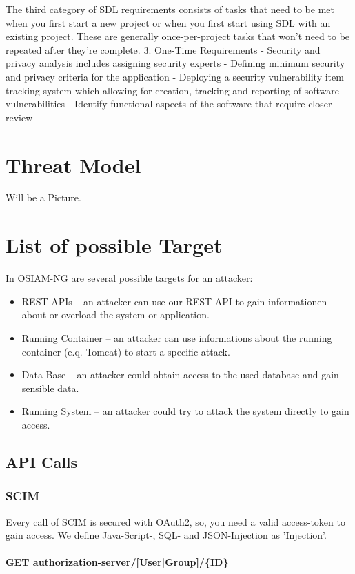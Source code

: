 The third category of SDL requirements consists of tasks that need to be met when you first start a new project or when you first start using SDL with an existing project. These are generally once-per-project tasks that won’t need to be repeated after they’re complete.
3. One-Time Requirements
	- Security and privacy analysis includes assigning security experts
	- Defining minimum security and privacy criteria for the application
	- Deploying a security vulnerability item tracking system which allowing for creation, tracking and reporting of software vulnerabilities
	- Identify functional aspects of the software that require closer review

\section{Threat Model}
Will be a Picture.

\section{List of possible Target}
In OSIAM-NG are several possible targets for an attacker:
\begin{itemize}
\item REST-APIs -- an attacker can use our REST-API to gain informationen about or overload the system or application.
\item Running Container -- an attacker can use informations about the running container (e.q. Tomcat) to start a specific attack.
\item Data Base -- an attacker could obtain access to the used database and gain sensible data.
\item Running System -- an attacker could try to attack the system directly to gain access.
\end{itemize}

\subsection{API Calls}
\subsubsection{SCIM}
Every call of SCIM is secured with OAuth2, so, you need a valid access-token to gain access. We define Java-Script-, SQL- and JSON-Injection as 'Injection'.

\paragraph{GET authorization-server/[User|Group]/\{ID\}}

